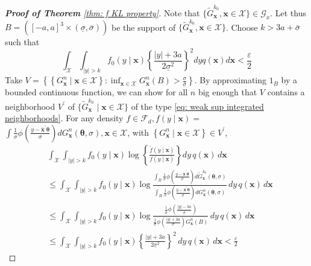 \begin{proof}[\hypertarget{proof of thm KL property}{\textbf{Proof of Theorem}} \ref{thm: f KL property}]
Note that $\{\tilde{G}^{k_0}_{\boldsymbol{x}}, \boldsymbol{x} \in \mathcal{X}\} \in \mathcal{G}_{x}$. Let thus $B=\left([-a, a]^3 \times(\underline{\sigma}, \bar{\sigma})\right)$ be the support of $\{\tilde{G}^{k_0}_{\boldsymbol{x}}, \boldsymbol{x} \in \mathcal{X}\}$. Choose $k>3 a+\bar{\sigma}$ such that
$$
\int_{\mathcal{X}} \int_{|y|>k} f_0(y \mid \boldsymbol{x})\left\{\frac{|y|+3 a}{2 \underline{\sigma}^2}\right\}^2 d y q(\boldsymbol{x}) d \boldsymbol{x}<\frac{\varepsilon}{2}
$$
Take $V=\left\{\left\{G^n_{\boldsymbol{x}} \mid \boldsymbol{x} \in \mathcal{X}\right\}: \inf _{\boldsymbol{x} \in \mathcal{X}} G^n_{\boldsymbol{x}}(B)>\frac{\sigma}{\bar{\sigma}}\right\}$. By approximating $1_B$ by a bounded continuous function, we can show for all $n$ big enough that $V$ contains a neighborhood $V^{\prime}$ of $\{\tilde{G}^{k_0}_{\boldsymbol{x}} \mid \boldsymbol{x} \in \mathcal{X}\}$ of the type \eqref{eq: weak sup integrated neighborhoods}. For any density $f \in \mathcal{F}_d, f(y \mid \boldsymbol{x})=$ $\int \frac{1}{\sigma} \phi(\frac{y-\bar{\boldsymbol{x}}^{\prime} \boldsymbol{\theta}}{\sigma}) d G^n_{\boldsymbol{x}}(\boldsymbol{\theta}, \sigma), \boldsymbol{x} \in \mathcal{X}$, with $\left\{G^n_{\boldsymbol{x}} \mid \boldsymbol{x} \in \mathcal{X}\right\} \in V^{\prime}$,
$$
\begin{aligned}
& \int_{\mathcal{X}} \int_{|y|>k} f_0(y \mid \boldsymbol{x}) \log \left\{\frac{\tilde{f}(y \mid \boldsymbol{x})}{f(y \mid \boldsymbol{x})}\right\} d y \, q(\boldsymbol{x}) \,  d \boldsymbol{x} \\
& \leq \int_{\mathcal{X}} \int_{|y|>k} f_0(y \mid \boldsymbol{x}) \log \frac{\int_B \frac{1}{\sigma} \phi\left(\frac{y-\bar{\boldsymbol{x}}^{\prime} \boldsymbol{\theta}}{\sigma}\right) d \tilde{G}^{k_0}_{\boldsymbol{x}}(\boldsymbol{\theta}, \sigma)}{\int_B \frac{1}{\sigma} \phi\left(\frac{y-\bar{\boldsymbol{x}}^{\prime} \boldsymbol{\theta}}{\sigma}\right) d G^n_{\boldsymbol{x}}(\boldsymbol{\theta}, \sigma)} \, d y \, q(\boldsymbol{x}) \, d \boldsymbol{x} \\
& \leq \int_{\mathcal{X}} \int_{|y|>k} f_0(y \mid \boldsymbol{x}) \log \frac{\frac{1}{\bar{\sigma}} \phi\left(\frac{|y|-3 a}{\bar{\sigma}}\right)}{\frac{1}{\sigma} \phi\left(\frac{|y|+3 a}{\sigma}\right) G^n_{\boldsymbol{x}}(B)} \,  d y \, q(\boldsymbol{x}) \, d \boldsymbol{x} \\
& \leq \int_{\mathcal{X}} \int_{|y|>k} f_0(y \mid \boldsymbol{x})\left\{\frac{|y|+3 a}{2 \underline{\sigma}^2}\right\}^2 \, d y \, q(\boldsymbol{x}) \,  d \boldsymbol{x}<\frac{\varepsilon}{2}

\end{aligned}$$
\end{proof}
